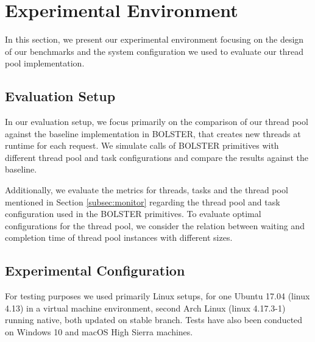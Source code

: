 \documentclass[conference]{IEEEtran}
\begin{document}
\section{Experimental Environment}
In this section, we present our experimental environment focusing on the design of our benchmarks and the system configuration we used to evaluate our thread pool implementation.

\subsection{Evaluation Setup}
In our evaluation setup, we focus primarily on the comparison of our thread pool against the baseline implementation in BOLSTER, that creates new threads at runtime for each request. We simulate calls of BOLSTER primitives with different thread pool and task configurations and compare the results against the baseline.

Additionally, we evaluate the metrics for threads, tasks and the thread pool mentioned in Section \ref{subsec:monitor} regarding the thread pool and task configuration used in the BOLSTER primitives. To evaluate optimal configurations for the thread pool, we consider the relation between waiting and completion time of thread pool instances with different sizes.


\subsection{Experimental Configuration}

For testing purposes we used primarily Linux setups, for one Ubuntu 17.04
(linux 4.13) in a virtual machine environment, second Arch Linux (linux
4.17.3-1) running native, both updated on stable branch. Tests have also been
conducted on Windows 10 and macOS High Sierra machines.
\end{document}
